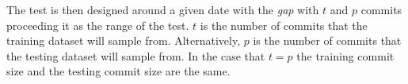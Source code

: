 




The test is then designed around a given date with the \textit{gap} with $t$ and $p$ commits proceeding it as the range of the test. $t$ is the number of commits that the training dataset will sample from. Alternatively, $p$ is the number of commits that the testing dataset will sample from. In the case that $t = p$ the training commit size and the testing commit size are the same.





